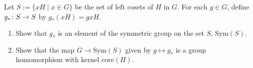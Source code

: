 \documentclass[12pt]{article}
\def\Color#1#2{\special{color push cmyk #1}#2\special{color pop}}
\def\TAMU#1{\Color{.15 1. .39 .69}{#1}}
\def\defcolor#1{\TAMU{#1}}
\begin{document}
\begin{enumerate}
 Let $S:=\{xH\mid x\in G\}$ be the set of left cosets of $H$ in $G$.
 For each $g\in G$, define $\defcolor{g_*}\colon S\to S$ by
 $g_*(xH)=gxH$.
 \begin{enumerate}
  \item Show that $g_*$ is an element of the symmetric group on the set $S$, $\mbox{Sym}(S)$.
  \item Show that the map $G\to\mbox{Sym}(S)$ given by $g\mapsto g_*$ is a group homomorphism
         with kernel  $\mbox{core}(H)$. 
 \vspace{-2pt}
 \end{enumerate}


      
\end{enumerate}
\end{document}
